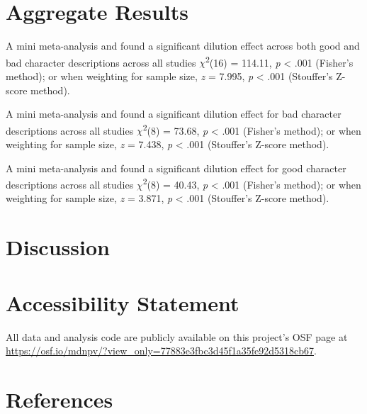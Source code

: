 \documentclass[
  man,floatsintext]{apa7}
\begin{document}
\newpage

\section{Aggregate Results}\label{aggregate-results}

A mini meta-analysis and found a significant dilution effect across both good and bad character descriptions across all studies \(\chi\)\textsuperscript{2}(16) = 114.11, \emph{p} \textless{} .001 (Fisher's method); or when weighting for sample size, \emph{z} = 7.995, \emph{p} \textless{} .001 (Stouffer's Z-score method).

A mini meta-analysis and found a significant dilution effect for bad character descriptions across all studies \(\chi\)\textsuperscript{2}(8) = 73.68, \emph{p} \textless{} .001 (Fisher's method); or when weighting for sample size, \emph{z} = 7.438, \emph{p} \textless{} .001 (Stouffer's Z-score method).

A mini meta-analysis and found a significant dilution effect for good character descriptions across all studies \(\chi\)\textsuperscript{2}(8) = 40.43, \emph{p} \textless{} .001 (Fisher's method); or when weighting for sample size, \emph{z} = 3.871, \emph{p} \textless{} .001 (Stouffer's Z-score method).

\section{Discussion}\label{discussion}

\section{Accessibility Statement}\label{accessibility-statement}

All data and analysis code are publicly available on this project's OSF page at \color{blue}\url{https://osf.io/mdnpv/?view_only=77883e3fbc3d45f1a35fe92d5318cb67}\color{black}.

\newpage

\section{References}\label{references}
\end{document}
